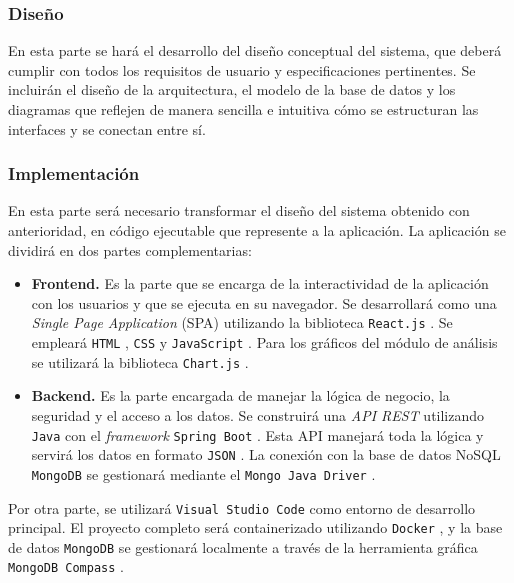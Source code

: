 \vspace{-0.1cm}

\subsubsection{Diseño}
\label{ssec:diseno}
En esta parte se hará el desarrollo del diseño conceptual del sistema, que deberá cumplir con todos los requisitos de usuario y especificaciones pertinentes. Se incluirán el diseño de la arquitectura, el modelo de la base de datos y los diagramas que reflejen de manera sencilla e intuitiva cómo se estructuran las interfaces y se conectan entre sí.

\vspace{-0.1cm}

\subsubsection{Implementación}
\label{ssec:implementacion}
En esta parte será necesario transformar el diseño del sistema obtenido con anterioridad, en código ejecutable que represente a la aplicación. La aplicación se dividirá en dos partes complementarias:

\begin{itemize}
    \item\textbf{Frontend.} Es la parte que se encarga de la interactividad de la aplicación con los usuarios y que se ejecuta en su navegador. Se desarrollará como una \textit{Single Page Application} (SPA) utilizando la biblioteca \texttt{React.js} \cite{bib:react}. Se empleará \texttt{HTML} \cite{bib:html}, \texttt{CSS} \cite{bib:css} y \texttt{JavaScript} \cite{bib:js}. Para los gráficos del módulo de análisis se utilizará la biblioteca \texttt{Chart.js} \cite{bib:chartjs}.

    \item\textbf{Backend.} Es la parte encargada de manejar la lógica de negocio, la seguridad y el acceso a los datos. Se construirá una \textit{API REST} utilizando \texttt{Java} \cite{bib:java} con el \textit{framework} \texttt{Spring Boot} \cite{bib:springboot}. Esta API manejará toda la lógica y servirá los datos en formato \texttt{JSON} \cite{bib:json}. La conexión con la base de datos NoSQL \texttt{MongoDB} \cite{bib:mongodb} se gestionará mediante el \texttt{Mongo Java Driver} \cite{bib:mongojavadriver}.
\end{itemize}

Por otra parte, se utilizará \texttt{Visual Studio Code} \cite{bib:vscode} como entorno de desarrollo principal. El proyecto completo será containerizado utilizando \texttt{Docker} \cite{bib:docker}, y la base de datos \texttt{MongoDB} se gestionará localmente a través de la herramienta gráfica \texttt{MongoDB Compass} \cite{bib:mongodbcompass}.

